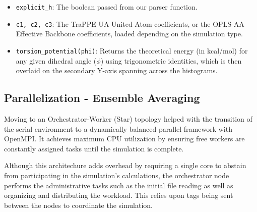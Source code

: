 \begin{itemize}
\tightlist
\item
  \texttt{explicit\_h}: The boolean passed from our parser function.
\item
  \texttt{c1,\ c2,\ c3}: The TraPPE-UA United Atom coefficients, or the
  OPLS-AA Effective Backbone coefficients, loaded depending on the
  simulation type.
\item
  \texttt{torsion\_potential(phi)}: Returns the theoretical energy (in
  kcal/mol) for any given dihedral angle (\(\phi\)) using trigonometric
  identities, which is then overlaid on the secondary Y-axis spanning
  across the histograms.
\end{itemize}

\subsection{Parallelization - Ensemble
Averaging}\label{parallelization---ensemble-averaging}

Moving to an Orchestrator-Worker (Star) topology helped with the
transition of the serial environment to a dynamically balanced parallel
framework with OpenMPI. It achieves maximum CPU utilization by ensuring
free workers are constantly assigned tasks until the simulation is
complete.

Although this architechure adds overhead by requiring a single core to
abstain from participating in the simulation's calculations, the
orchestrator node performs the administrative tasks such as the initial
file reading as well as organizing and distributing the workload. This
relies upon tags being sent between the nodes to coordinate the
simulation.

\begin{Shaded}
\begin{Highlighting}[]
  \NormalTok{, } \DataTypeTok{::}\KeywordTok{=} 
  \NormalTok{, } \DataTypeTok{::}\KeywordTok{=} 
  \NormalTok{, } \DataTypeTok{::}\KeywordTok{=} 
  \NormalTok{, } \DataTypeTok{::}\KeywordTok{=} 
  \NormalTok{, } \DataTypeTok{::}\KeywordTok{=} 
  \NormalTok{, } \DataTypeTok{::}\KeywordTok{=} 
  \NormalTok{, } \DataTypeTok{::}\KeywordTok{=} 
\end{Highlighting}
\end{Shaded}

